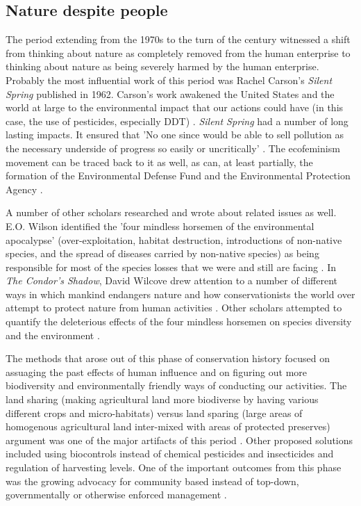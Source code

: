 \documentclass[rutwik_proposal.tex]{subfiles}
\begin{document}
\subsection{Nature despite people}\label{subsec:pplharmnature}

The period extending from the 1970s to the turn of the century witnessed a shift from thinking about nature as completely removed from the human enterprise to thinking about nature as being severely harmed by the human enterprise. Probably the most influential work of this period was Rachel Carson's \textit{Silent Spring} published in 1962. Carson's work awakened the United States and the world at large to the environmental impact that our actions could have (in this case, the use of pesticides, especially DDT) \cite{Carson02}. \textit{Silent Spring} had a number of long lasting impacts. It ensured that 'No one since would be able to sell pollution as the necessary underside of progress so easily or uncritically' \cite{Hynes89}. The ecofeminism movement can be traced back to it as well, as can, at least partially, the formation of the Environmental Defense Fund and the Environmental Protection Agency \cite{Hynes89}.

A number of other scholars researched and wrote about related issues as well. E.O. Wilson identified the 'four mindless horsemen of the environmental apocalypse' (over-exploitation, habitat destruction, introductions of non-native species, and the spread of diseases carried by non-native species) as being responsible for most of the species losses that we were and still are facing \cite{Wilson92}. In \textit{The Condor's Shadow}, David Wilcove drew attention to a number of different ways in which mankind endangers nature and how conservationists the world over attempt to protect nature from human activities \cite{Wilcove00}. Other scholars attempted to quantify the deleterious effects of the four mindless horsemen on species diversity and the environment \cite{Ehrlich94, Wilcove98, Brendan11, Vitousek97, Wilcove13, Poland06, Anagnostakis87, Greenberg14}.

The methods that arose out of this phase of conservation history focused on assuaging the past effects of human influence and on figuring out more biodiversity and environmentally friendly ways of conducting our activities. The land sharing (making agricultural land more biodiverse by having various different crops and micro-habitats) versus land sparing (large areas of homogenous agricultural land inter-mixed with areas of protected preserves) argument was one of the major artifacts of this period \cite{Phalan11, Fischer08, Fischer14}. Other proposed solutions included using biocontrols instead of chemical pesticides and insecticides \cite{Handelsmann96} and regulation of harvesting levels. One of the important outcomes from this phase was the growing advocacy for community based instead of top-down, governmentally or otherwise enforced management \cite{Hutton05}.
\end{document}
